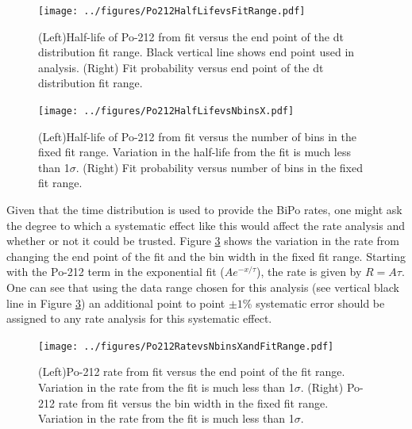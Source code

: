 \begin{figure}[!h]
\centering
\texttt{[image: ../figures/Po212HalfLifevsFitRange.pdf]}
\caption{\label{fig:Po212halflifevsfitrange} (Left)Half-life of Po-212 from fit versus the end point of the dt distribution fit range. Black vertical line shows end point used in analysis. (Right) Fit probability versus end point of the dt distribution fit range.}
\end{figure}

\begin{figure}[t]
\centering
\texttt{[image: ../figures/Po212HalfLifevsNbinsX.pdf]}
\caption{\label{fig:Po212halflifevsNbinsX}(Left)Half-life of Po-212 from fit versus the number of bins in the fixed fit range. Variation in the half-life from the fit is much less than 1$\sigma$.  (Right) Fit probability versus number of bins in the fixed fit range.}
\end{figure}

Given that the time distribution is used to provide the BiPo rates, one might ask the degree to which a systematic effect like this would affect the rate analysis and whether or not it could be trusted. Figure \ref{fig:Po212RatevsNbinsXandFitRange} shows the variation in the rate from changing the end point of the fit and the bin width in the fixed fit range. Starting with the Po-212 term in the exponential fit ($Ae^{-x/\tau}$), the rate is given by $R=A\tau$. One can see that using the data range chosen for this analysis (see vertical black line in Figure \ref{fig:Po212RatevsNbinsXandFitRange}) an additional point to point $\pm1$\% systematic error should be assigned to any rate analysis for this systematic effect. 
\begin{figure}[t]
 	\centering
 	\texttt{[image: ../figures/Po212RatevsNbinsXandFitRange.pdf]}
 	\caption{\label{fig:Po212RatevsNbinsXandFitRange}(Left)Po-212 rate from fit versus the end point of the fit range. Variation in the rate from the fit is much less than 1$\sigma$.  (Right) Po-212 rate from fit versus the bin width in the fixed fit range. Variation in the rate from the fit is much less than 1$\sigma$.}
\end{figure}

